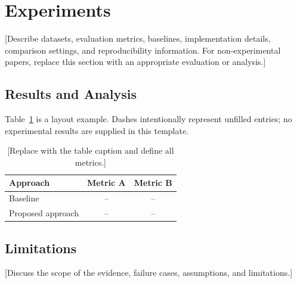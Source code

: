 \section{Experiments}\label{sec:experiments}
[Describe datasets, evaluation metrics, baselines, implementation details,
comparison settings, and reproducibility information. For non-experimental
papers, replace this section with an appropriate evaluation or analysis.]

\subsection{Results and Analysis}
Table~\ref{tab:results} is a layout example. Dashes intentionally represent
unfilled entries; no experimental results are supplied in this template.
\begin{table}[htbp]
  \centering
  \caption{[Replace with the table caption and define all metrics.]}
  \label{tab:results}
  \begin{tabularx}{0.88\linewidth}{Xcc}
    \toprule
    Approach & Metric A & Metric B \\
    \midrule
    Baseline & -- & -- \\
    Proposed approach & -- & -- \\
    \bottomrule
  \end{tabularx}
\end{table}

\subsection{Limitations}
[Discuss the scope of the evidence, failure cases, assumptions, and limitations.]
